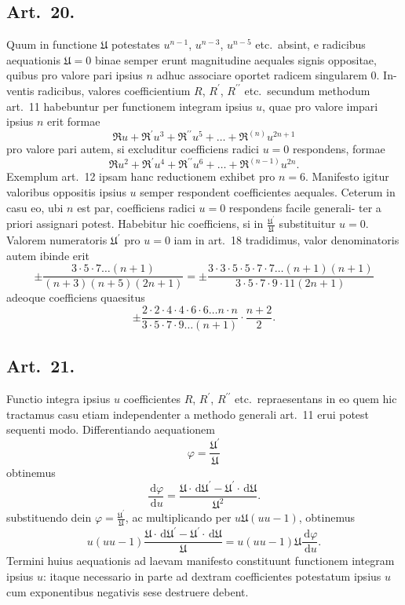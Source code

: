 \documentclass[12pt,a4paper]{article}
\newcommand{\UU}{\mathfrak{U}}
\newcommand{\dd}{\,\mathrm{d}}
\begin{document}
\subsection*{Art.\ 20.}

Quum in functione $\UU$ potestates $u^{n-1}$, $u^{n-3}$, $u^{n-5}$ etc.\ absint, e radicibus
aequationis $\UU = 0$ binae semper erunt magnitudine aequales signis oppositae,
quibus pro valore pari ipsius $n$ adhuc associare oportet radicem singularem $0$. In-
ventis radicibus, valores coefficientium $R$, $R^\prime$, $R^{\prime\prime}$ etc.\ secundum methodum art.\ 11
habebuntur per functionem integram ipsius $u$, quae pro valore impari ipsius $n$
erit formae
\[
\mathfrak{R} u + \mathfrak{R}^\prime u^3 + \mathfrak{R}^{\prime\prime} u^5 + \ldots + \mathfrak{R}^{(n)} u^{2n+1}
\]
pro valore pari autem, si excluditur coefficiens radici $u = 0$ respondens, formae
\[
\mathfrak{R} u^2 + \mathfrak{R}^\prime u^4 + \mathfrak{R}^{\prime\prime} u^6 + \ldots + \mathfrak{R}^{(n-1)} u^{2n}.
\]
Exemplum art.\ 12 ipsam hanc reductionem exhibet pro $n = 6$. Manifesto igitur
valoribus oppositis ipsius $u$ semper respondent coefficientes aequales. Ceterum
in casu eo, ubi $n$ est par, coefficiens radici $u = 0$ respondens facile generali-
ter a priori assignari potest. Habebitur hic coefficiens, si in $\frac{\UU^\prime}{\UU}$ substituitur
$u = 0$. Valorem numeratoris $\UU^\prime$ pro $u = 0$ iam in art.\ 18 tradidimus, valor
denominatoris autem ibinde erit
\[
\pm \frac{3 \cdot 5 \cdot 7 \ldots (n+1)}{(n+3)(n+5)(2n+1)} = \pm \frac{3 \cdot 3 \cdot 5 \cdot 5 \cdot 7 \cdot 7 \ldots (n+1)(n+1)}{3 \cdot 5 \cdot 7 \cdot 9 \cdot 11(2n+1)}
\]
adeoque coefficiens quaesitus
\[
\pm \frac{2 \cdot 2 \cdot 4 \cdot 4 \cdot 6 \cdot 6 \ldots n \cdot n}{3 \cdot 5 \cdot 7 \cdot 9 \ldots (n+1)} \cdot \frac{n+2}{2}.
\]

\subsection*{Art.\ 21.}

Functio integra ipsius $u$ coefficientes $R$, $R^\prime$, $R^{\prime\prime}$ etc.\ repraesentans in eo
quem hic tractamus casu etiam independenter a methodo generali art.\ 11 erui
potest sequenti modo. Differentiando aequationem
\[
\varphi = \frac{\UU^\prime}{\UU}
\]
obtinemus
\[
\frac{\dd \varphi}{\dd u} = \frac{\UU \cdot \dd \UU^\prime - \UU^\prime \cdot \dd \UU}{\UU^2}.
\]
substituendo dein $\varphi = \frac{\UU^\prime}{\UU}$, ac multiplicando per $u \UU(uu-1)$, obtinemus
\[
u(uu-1) \frac{\UU \cdot \dd \UU^\prime - \UU^\prime \cdot \dd \UU}{\UU} = u(uu-1) \UU \frac{\dd \varphi}{\dd u}.
\]
Termini huius aequationis ad laevam manifesto constituunt functionem integram
ipsius $u$: itaque necessario in parte ad dextram coefficientes potestatum ipsius $u$
cum exponentibus negativis sese destruere debent.
\end{document}
